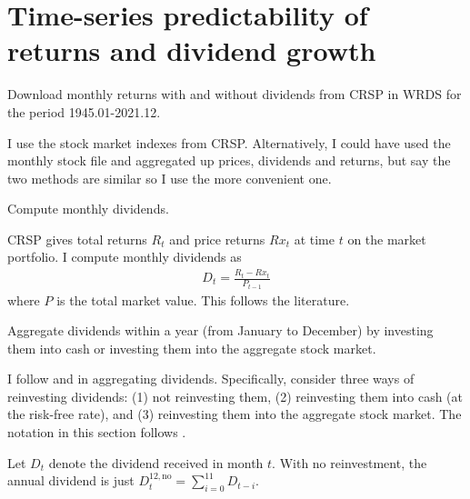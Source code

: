 \section{Time-series predictability of returns and dividend growth}


\begin{answer}[Part a]
Download monthly returns with and without dividends from CRSP in WRDS for the period 1945.01-2021.12.
\end{answer}
I use the stock market indexes from CRSP. Alternatively, I could have used the monthly stock file and aggregated up prices, dividends and returns, but \cite*{englebook} say the two methods are similar so I use the more convenient one.

\begin{answer}[Part b]
Compute monthly dividends.
\end{answer}
CRSP gives total returns $R_t$ and price returns $Rx_t$ at time $t$ on the market portfolio. I compute monthly dividends as
\begin{align} 
D_t = \frac{R_t - Rx_t }{P_{t-1}}
\end{align}
where $P$ is the total market value. This follows the literature.

\begin{answer}[Part c ]
Aggregate dividends within a year (from January to December) by investing them into cash or investing them into the aggregate stock market.
\end{answer}
I follow \cite{koijen2011} and \cite{chen2009jfe} in aggregating dividends. Specifically, consider three ways of reinvesting dividends: (1) not reinvesting them, (2) reinvesting them into cash (at the risk-free rate), and (3) reinvesting them into the aggregate stock market. The notation in this section follows \cite{chen2009jfe}. 

Let $D_t$ denote the dividend received in month $t$. With no reinvestment, the annual dividend is just $D_t^{12,\text{no}} =\sum_{i=0}^{11} D_{t-i}$.

